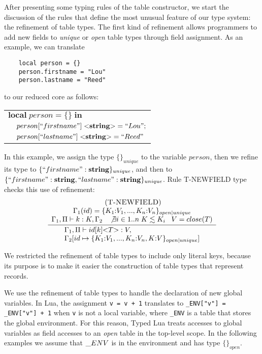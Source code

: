 \documentclass{sigplanconf}
\newcommand{\String}{\mathbf{string}}
\newcommand{\mylabel}[1]{\; (\textsc{#1})}
\newcommand{\env}{\Gamma}
\newcommand{\penv}{\Pi}
\begin{document}
After presenting some typing rules of the table constructor,
we start the discussion of the rules that define the most
unusual feature of our type system: the refinement of table types.
The first kind of refinement allows programmers to add new
fields to \emph{unique} or \emph{open} table types through
field assignment.
As an example, we can translate
\begin{verbatim}
    local person = {}
    person.firstname = "Lou"
    person.lastname = "Reed"
\end{verbatim}
to our reduced core as follows:
\begin{center}
\begin{tabular}{ll}
\multicolumn{2}{l}{$\mathbf{local} \; person = \{\} \; \mathbf{in}$}\\
& \multicolumn{1}{l}{$person[``firstname"] \; {<}\String{>} = ``Lou";$}\\
& \multicolumn{1}{l}{$person[``lastname"] \; {<}\String{>} = ``Reed"$}
\end{tabular}
\end{center}

In this example, we assign the type $\{\}_{unique}$ to the variable
$person$, then we refine its type to $\{``firstname":\String\}_{unique}$,
and then to $\{``firstname":\String, ``lastname":\String\}_{unique}$.
Rule \textsc{T-NEWFIELD} type checks this use of refinement:
\[
\begin{array}{c}
\mylabel{T-NEWFIELD}\\
\dfrac{\begin{array}{c}
       \env_{1}(id) = \{ K_{1}{:}V_{1}, ..., K_{n}{:}V_{n} \}_{open|unique}\\
       \env_{1}, \penv \vdash k:K, \env_{2} \;\;\;
       \not \exists i \in 1..n \; K \lesssim K_{i} \;\;\;
       V = close(T)
       \end{array}}
      {\begin{array}{l}
       \env_{1}, \penv \vdash id[k] {<}T{>}:V, \\
       \env_{2}[id \mapsto \{ K_{1}{:}V_{1}, ..., K_{n}{:}V_{n}, K{:}V\}_{open|unique}]
       \end{array}}
\end{array}
\]

We restricted the refinement of table types to include only literal
keys, because its purpose is to make it easier the construction of
table types that represent records.

We use the refinement of table types to handle the declaration of
new global variables.
In Lua, the assignment \texttt{v = v + 1} translates to
\texttt{\string_ENV["v"] = \string_ENV["v"] + 1} when \texttt{v}
is not a local variable, where \texttt{\string_ENV} is a table
that stores the global environment.
For this reason, Typed Lua treats accesses to global variables as field accesses
to an \emph{open} table in the top-level scope.
In the following examples we assume that $\string_ENV$ is in the
environment and has type $\{\}_{open}$.
\end{document}
